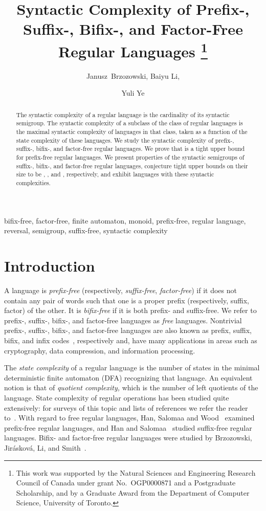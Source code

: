 \documentclass{llncs}
\title{Syntactic Complexity of Prefix-, Suffix-, Bifix-, and Factor-Free Regular Languages
\thanks{This work was supported by the Natural Sciences and Engineering Research Council of Canada under grant No.~OGP0000871 and  a Postgraduate Scholarship, and by a Graduate Award from the Department of Computer Science, University of Toronto.
}}
\author{Janusz~Brzozowski\inst{1}, Baiyu Li\inst{1}, \and Yuli Ye\inst{2}}
\institute{David R. Cheriton School of Computer Science, University of Waterloo \\
Waterloo, ON, Canada N2L 3G1\\
email: \email{\{brzozo, b5li\}@uwaterloo.ca}
\and
Department of Computer Science, University of Toronto\\
 Toronto, ON,  Canada M5S 3G4\\
email: \email{y3ye@cs.toronto.edu}
}
\newcommand{\noin}{\noindent}
\begin{document}
\maketitle

\begin{abstract}
The syntactic complexity of a regular language is the cardinality of its syntactic semigroup.
The syntactic complexity of a subclass of the class of regular languages is the maximal syntactic complexity of languages in that class, taken as a function of the state complexity  of these languages.
We study the syntactic complexity of  prefix-, suffix-, bifix-, and factor-free regular languages.
We prove that  is a tight upper bound for prefix-free regular languages. We present properties of the syntactic semigroups of suffix-, bifix-, and factor-free regular languages, conjecture tight upper bounds on their size to be , , and , respectively, and exhibit languages with these syntactic complexities.
\end{abstract}

\noin{\bf keyword}
bifix-free, factor-free, finite automaton, monoid, prefix-free, regular language, reversal, semigroup,  suffix-free, syntactic complexity 

\section{Introduction}

A language is \emph{prefix-free} (respectively, \emph{suffix-free}, \emph{factor-free}) if it does not contain any pair of words such that one is a proper prefix (respectively, suffix, factor) of the other. It is \emph{bifix-free} if it is both prefix- and suffix-free.
We refer to  prefix-, suffix-, bifix-, and factor-free languages as \emph{free} languages.
Nontrivial prefix-, suffix-, bifix-, and factor-free languages are also known as prefix, suffix, bifix, and infix codes~\cite{BPR09,Shy01}, respectively and, have many applications in areas such as cryptography, data compression, and information processing. 


The \emph{state complexity} of a regular language is the  number of states in the minimal deterministic finite automaton (DFA) recognizing that language. 
An equivalent notion is that of \emph{quotient complexity,} which is the number of left quotients of the language.
State complexity of regular operations has been studied quite extensively: for surveys of this topic and lists of references we refer the reader to~\cite{Brz09,Yu01}. 
With regard to free regular languages,  Han, Salomaa and Wood~\cite{HSW09} examined  prefix-free regular languages, and  Han and Salomaa~\cite{HS09} studied suffix-free regular languages. 
Bifix- and factor-free regular languages were studied by Brzozowski, Jir\'askov\'a, Li, and Smith~\cite{BJLS11}. 
\end{document}
